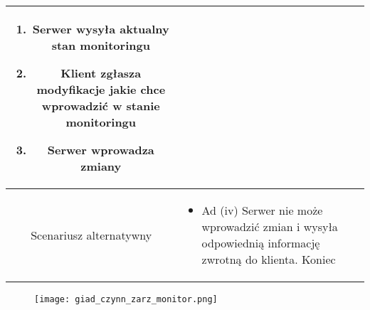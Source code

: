 \documentclass{article}
\begin{document}
\begin{enumerate}
\begin{enumerate}
\begin{table}[H]
\begin{tabular}{|c|p{7cm}|}
\begin{enumerate}
\item Serwer wysyła aktualny stan monitoringu

\item Klient zgłasza modyfikacje jakie chce wprowadzić w stanie monitoringu

\item Serwer wprowadza zmiany\end{enumerate} \\
						\hline
						Scenariusz alternatywny & \begin{itemize}\item Ad (iv) Serwer nie może wprowadzić zmian i wysyła odpowiednią informację zwrotną do klienta. Koniec\end{itemize}                                                                                                                                           \\
						\hline
					\end{tabular}
				\end{table}

				\begin{figure}[h]
					\centering
					\texttt{[image: giad\_czynn\_zarz\_monitor.png]}
				\end{figure}


\end{enumerate}
\end{enumerate}
\end{document}
